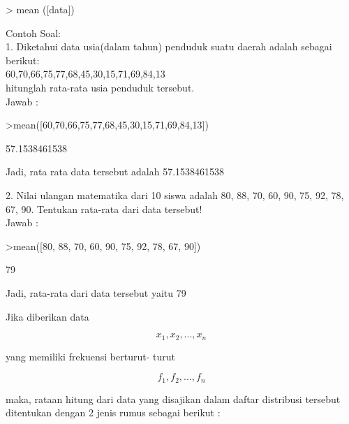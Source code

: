 \documentclass[a4paper,10pt]{article}
\begin{document}
\begin{eulernotebook}
\begin{eulercomment}
\begin{eulercomment}
\begin{eulercomment}
\begin{eulercomment}
\begin{eulercomment}
\begin{eulercomment}
\begin{eulercomment}
\begin{eulercomment}
\begin{eulercomment}
\begin{eulercomment}
\begin{eulercomment}
\textgreater{} mean ([data])

Contoh Soal:\\
1. Diketahui data usia(dalam tahun) penduduk suatu daerah adalah
sebagai berikut:\\
60,70,66,75,77,68,45,30,15,71,69,84,13\\
hitunglah rata-rata usia penduduk tersebut.\\
Jawab :
\end{eulercomment}
\begin{eulerprompt}
>mean([60,70,66,75,77,68,45,30,15,71,69,84,13])
\end{eulerprompt}
\begin{euleroutput}
  57.1538461538
\end{euleroutput}
\begin{eulercomment}
Jadi, rata rata data tersebut adalah 57.1538461538

2. Nilai ulangan matematika dari 10 siswa adalah 80, 88, 70, 60, 90,
75, 92, 78, 67, 90. Tentukan rata-rata dari data tersebut!\\
Jawab :
\end{eulercomment}
\begin{eulerprompt}
>mean([80, 88, 70, 60, 90, 75, 92, 78, 67, 90])
\end{eulerprompt}
\begin{euleroutput}
  79
\end{euleroutput}
\begin{eulercomment}
Jadi, rata-rata dari data tersebut yaitu 79

\end{eulercomment}
\begin{eulercomment}
Jika diberikan data\\
\end{eulercomment}
\begin{eulerformula}
\[
x_1,x_2,...,x_n
\]
\end{eulerformula}
\begin{eulercomment}
yang memiliki frekuensi berturut- turut\\
\end{eulercomment}
\begin{eulerformula}
\[
f_1,f_2,...,f_n
\]
\end{eulerformula}
\begin{eulercomment}
maka, rataan hitung dari data yang disajikan dalam daftar distribusi
tersebut ditentukan dengan 2 jenis rumus sebagai berikut :


\end{eulercomment}
\end{eulercomment}
\end{eulercomment}
\end{eulercomment}
\end{eulercomment}
\end{eulercomment}
\end{eulercomment}
\end{eulercomment}
\end{eulercomment}
\end{eulercomment}
\end{eulercomment}
\end{eulernotebook}
\end{document}
